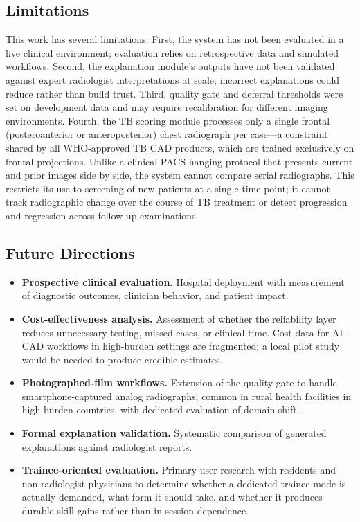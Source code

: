 \documentclass[conference, letterpaper]{IEEEtran}
\begin{document}
\subsection{Limitations}


This work has several limitations. First, the system has not been evaluated in a live clinical environment; evaluation relies on retrospective data and simulated workflows. Second, the explanation module's outputs have not been validated against expert radiologist interpretations at scale; incorrect explanations could reduce rather than build trust. Third, quality gate and deferral thresholds were set on development data and may require recalibration for different imaging environments. Fourth, the TB scoring module processes only a single frontal (posteroanterior or anteroposterior) chest radiograph per case---a constraint shared by all WHO-approved TB CAD products, which are trained exclusively on frontal projections. Unlike a clinical PACS hanging protocol that presents current and prior images side by side, the system cannot compare serial radiographs. This restricts its use to screening of new patients at a single time point; it cannot track radiographic change over the course of TB treatment or detect progression and regression across follow-up examinations.

\subsection{Future Directions}

\begin{itemize}
    \item \textbf{Prospective clinical evaluation.} Hospital deployment with measurement of diagnostic outcomes, clinician behavior, and patient impact.
    \item \textbf{Cost-effectiveness analysis.} Assessment of whether the reliability layer reduces unnecessary testing, missed cases, or clinical time. Cost data for AI-CAD workflows in high-burden settings are fragmented; a local pilot study would be needed to produce credible estimates.
    \item \textbf{Photographed-film workflows.} Extension of the quality gate to handle smartphone-captured analog radiographs, common in rural health facilities in high-burden countries, with dedicated evaluation of domain shift~\cite{nasser2023photographed}.
    \item \textbf{Formal explanation validation.} Systematic comparison of generated explanations against radiologist reports.
    \item \textbf{Trainee-oriented evaluation.} Primary user research with residents and non-radiologist physicians to determine whether a dedicated trainee mode is actually demanded, what form it should take, and whether it produces durable skill gains rather than in-session dependence.
\end{itemize}
\end{document}
